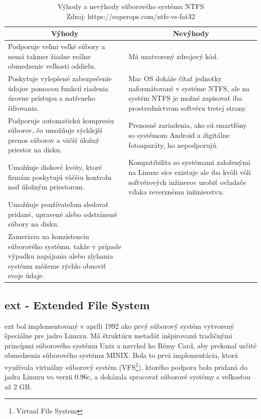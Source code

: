 \documentclass[12pt,oneside,slovak,a4paper]{article}
\begin{document}
\begin{table}[H]
\begin{tabularx}{\linewidth}{|X|X|}
\hline
\multicolumn{1}{|c|}{\textbf{Výhody}} & \multicolumn{1}{c|}{\textbf{Nevýhody}} \\ \hline
Podporuje veľmi veľké súbory a nemá takmer žiadne reálne obmedzenie veľkosti oddielu. & Má uzatvorený zdrojový kód. \\ \hline
Poskytuje vylepšené zabezpečenie údajov pomocou funkcií riadenia úrovne prístupu a natívneho šifrovania. & Mac OS dokáže čítať jednotky naformátované v systéme NTFS, ale na systém NTFS je možné zapisovať iba prostredníctvom softvéru tretej strany. \\ \hline
Podporuje automatickú kompresiu súborov, čo umožňuje rýchlejší prenos súborov a väčší úložný priestor na disku. & Prenosné zariadenia, ako sú smartfóny so systémom Android a digitálne fotoaparáty, ho nepodporujú. \\ \hline
Umožňuje diskové kvóty, ktoré firmám poskytujú väčšiu kontrolu nad úložným priestorom. & Kompatibilita so systémami založenými na Linuxe síce existuje ale iba kvôli vôli softvérových inžinerov urobiť ovladače vďaka reverznému inžinierstvu. \\ \hline
Umožňuje používateľom sledovať pridané, upravené alebo odstránené súbory na disku. &  \\ \hline
Zameriava na konzistenciu súborového systému, takže v prípade výpadku napájania alebo zlyhania systému môžeme rýchlo obnoviť svoje údaje. &  \\ \hline
\end{tabularx}
\centering
\captionsetup{justification=centering,margin=2cm}
\caption{Výhody a nevýhody súborového systému NTFS \\ Zdroj: https://superops.com/ntfs-vs-fat32}
\end{table}

\subsection{ext - Extended File System}
ext bol implementovaný v apríli 1992 ako prvý súborový systém vytvorený špeciálne pre jadro Linuxu. Má štruktúru metadát inšpirovanú tradičnými princípmi súborového systému Unix a navrhol ho Rémy Card, aby prekonal určité obmedzenia súborového systému MINIX. Bola to prvá implementácia, ktorá využívala virtuálny súborový systém (VFS\footnote{Virtual File System}), ktorého podpora bola pridaná do jadra Linuxu vo verzii 0.96c, a dokázala spracovať súborové systémy s veľkosťou až 2 GB.
\end{document}
